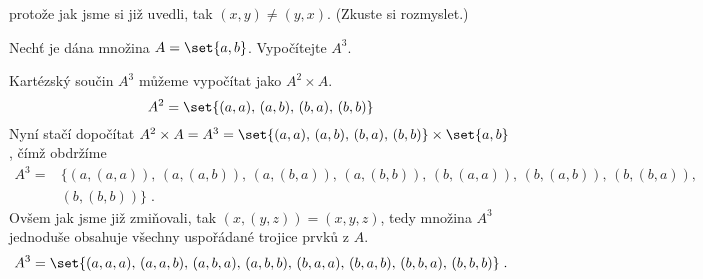 protože jak jsme si již uvedli, tak $(x,y)\neq (y,x)$. (Zkuste si rozmyslet.)
\begin{example}
    Nechť je dána množina $A=\set{a,b}$. Vypočítejte $A^3$.
\end{example}
\begin{solution}
    Kartézský součin $A^3$ můžeme vypočítat jako $A^2\times A$.
    \begin{equation*}
        A^2=\set{(a,a),\,(a,b),\,(b,a),\,(b,b)}
    \end{equation*}
    Nyní stačí dopočítat $A^2\times A=A^3=\set{(a,a),\,(a,b),\,(b,a),\,(b,b)}\times\set{a,b}$, čímž obdržíme
    \begin{align*}
        A^3=&\{(a,(a,a)),\,(a,(a,b)),\,(a,(b,a)),\,(a,(b,b)),\,(b,(a,a)),\,(b,(a,b)),\,(b,(b,a)),\\
        &(b,(b,b))\}\; .
    \end{align*}
    Ovšem jak jsme již zmiňovali, tak $(x,(y,z))=(x,y,z)$, tedy množina $A^3$ jednoduše obsahuje všechny uspořádané trojice prvků z $A$.
    \begin{equation*}
        A^3=\set{(a,a,a),\,(a,a,b),\,(a,b,a),\,(a,b,b),\,(b,a,a),\,(b,a,b),\,(b,b,a),\,(b,b,b)}\; .
    \end{equation*}
\end{solution}

